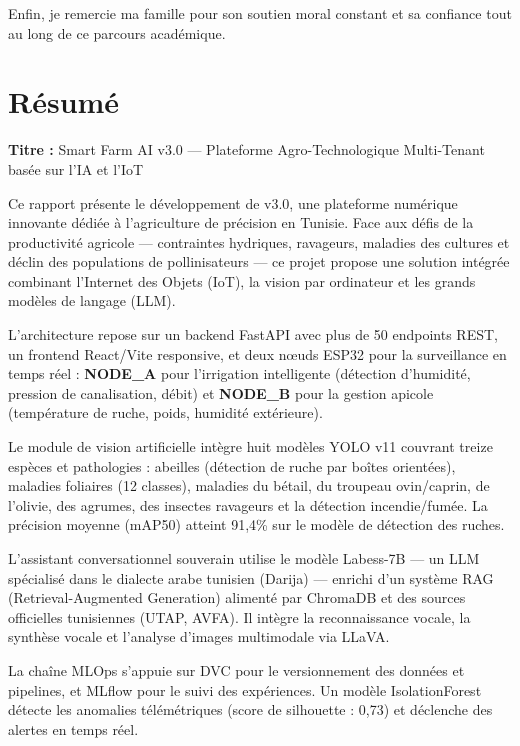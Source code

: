 Enfin, je remercie ma famille pour son soutien moral constant et sa confiance tout au long de ce parcours académique.

\cleardoublepage

\chapter*{Résumé}
\thispagestyle{empty}

\noindent\textbf{Titre :} Smart Farm AI v3.0 — Plateforme Agro-Technologique Multi-Tenant basée sur l'IA et l'IoT

\medskip
Ce rapport présente le développement de \farmAI{} v3.0, une plateforme numérique innovante dédiée à l'agriculture de précision en Tunisie. Face aux défis de la productivité agricole — contraintes hydriques, ravageurs, maladies des cultures et déclin des populations de pollinisateurs — ce projet propose une solution intégrée combinant l'Internet des Objets (IoT), la vision par ordinateur et les grands modèles de langage (LLM).

L'architecture repose sur un backend FastAPI avec plus de 50 endpoints REST, un frontend React/Vite responsive, et deux nœuds ESP32 pour la surveillance en temps réel : \textbf{NODE\_A} pour l'irrigation intelligente (détection d'humidité, pression de canalisation, débit) et \textbf{NODE\_B} pour la gestion apicole (température de ruche, poids, humidité extérieure).

Le module de vision artificielle intègre huit modèles YOLO v11 couvrant treize espèces et pathologies : abeilles (détection de ruche par boîtes orientées), maladies foliaires (12 classes), maladies du bétail, du troupeau ovin/caprin, de l'olivie, des agrumes, des insectes ravageurs et la détection incendie/fumée. La précision moyenne (mAP50) atteint 91,4\% sur le modèle de détection des ruches.

L'assistant conversationnel souverain utilise le modèle Labess-7B — un LLM spécialisé dans le dialecte arabe tunisien (Darija) — enrichi d'un système RAG (Retrieval-Augmented Generation) alimenté par ChromaDB et des sources officielles tunisiennes (UTAP, AVFA). Il intègre la reconnaissance vocale, la synthèse vocale et l'analyse d'images multimodale via LLaVA.

La chaîne MLOps s'appuie sur DVC pour le versionnement des données et pipelines, et MLflow pour le suivi des expériences. Un modèle IsolationForest détecte les anomalies télémétriques (score de silhouette : 0,73) et déclenche des alertes en temps réel.

